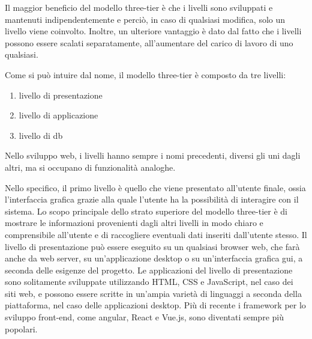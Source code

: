 Il maggior beneficio del modello three-tier è che i livelli sono sviluppati e mantenuti indipendentemente e perciò, in caso di qualsiasi modifica, solo un livello viene coinvolto. Inoltre, un ulteriore vantaggio è dato dal fatto che i livelli possono essere scalati separatamente, all'aumentare del carico di lavoro di uno qualsiasi.

Come si può intuire dal nome, il modello three-tier è composto da tre livelli: 
\begin{enumerate}
\item livello di presentazione
\item livello di applicazione
\item livello di \acrlong{db}
\end{enumerate}


Nello sviluppo web, i livelli hanno sempre i nomi precedenti, diversi gli uni dagli altri, ma si occupano di funzionalità analoghe.\newline

Nello specifico, il primo livello è quello che viene presentato all'utente finale, ossia l'interfaccia grafica grazie alla quale l'utente ha la possibilità di interagire con il sistema. Lo scopo principale dello strato superiore del modello three-tier è di mostrare le informazioni provenienti dagli altri livelli in modo chiaro e comprensibile all'utente e di raccogliere eventuali dati inseriti dall'utente stesso.
Il livello di presentazione può essere eseguito su un qualsiasi browser web, che farà anche da web server, su un'applicazione desktop o su un'interfaccia grafica \acrshort{gui}, a seconda delle esigenze del progetto.
Le applicazioni del livello di presentazione sono solitamente sviluppate utilizzando HTML, CSS e JavaScript, nel caso dei siti web, e possono essere scritte in un'ampia varietà di linguaggi a seconda della piattaforma, nel caso delle applicazioni desktop. Più di recente i \gls{framework} per lo sviluppo front-end, come \gls{angular}, React e Vue.js, sono diventati sempre più popolari. 

